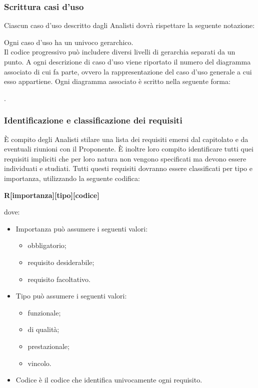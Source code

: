 \subsubsection{Scrittura casi d'uso}
Ciascun caso d'uso descritto dagli Analisti dovrà rispettare la seguente notazione:
\begin{center}
\end{center}
Ogni caso d'uso ha un  univoco gerarchico.\\
Il codice progressivo può includere diversi livelli di gerarchia separati da un punto.
A ogni descrizione di caso d'uso viene riportato il numero del diagramma associato di cui fa parte, ovvero la rappresentazione del caso d'uso generale a cui esso appartiene.
Ogni diagramma associato è scritto nella seguente forma:
\begin{center}
.
\end{center}

\subsubsection{Identificazione e classificazione dei requisiti}
\label{7.1}
È compito degli Analisti stilare una lista dei requisiti emersi dal capitolato e da eventuali riunioni con il Proponente. È inoltre loro compito identificare tutti quei requisiti impliciti che per loro natura non vengono specificati ma devono essere individuati e studiati. Tutti questi requisiti dovranno essere classificati per tipo e importanza, utilizzando la seguente codifica:
\begin{center}
\textbf{R[importanza][tipo][codice]}
\end{center}
dove:
\begin{itemize}
\item Importanza può assumere i seguenti valori:
\begin{itemize}
\item {}  obbligatorio;
\item {} requisito desiderabile;
\item {} requisito facoltativo.
\end{itemize}
\item Tipo può assumere i seguenti valori:
\begin{itemize}
\item {} funzionale;
\item {} di qualità;
\item {} prestazionale;
\item {} vincolo.
\end{itemize}
\item Codice è il codice che identifica univocamente ogni requisito.
\end{itemize}

